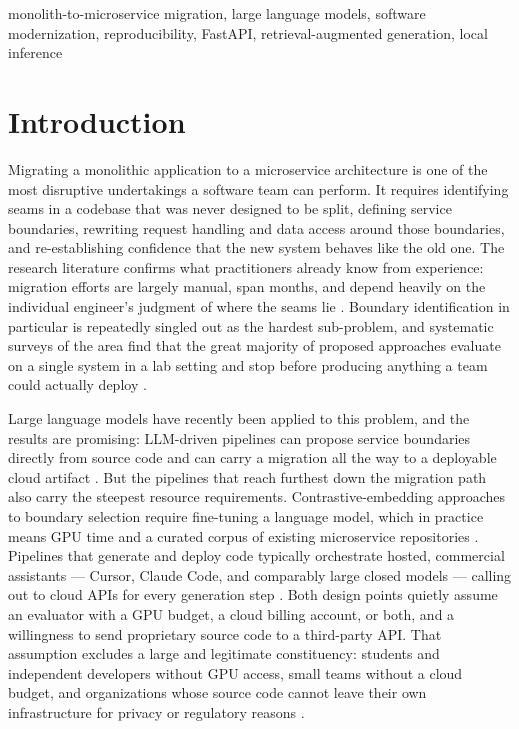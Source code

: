 \documentclass[conference]{IEEEtran}
\begin{document}
\begin{IEEEkeywords}
monolith-to-microservice migration, large language models, software modernization, reproducibility, FastAPI, retrieval-augmented generation, local inference
\end{IEEEkeywords}

\section{Introduction}

Migrating a monolithic application to a microservice architecture is one of the most disruptive undertakings a software team can perform. It requires identifying seams in a codebase that was never designed to be split, defining service boundaries, rewriting request handling and data access around those boundaries, and re-establishing confidence that the new system behaves like the old one. The research literature confirms what practitioners already know from experience: migration efforts are largely manual, span months, and depend heavily on the individual engineer's judgment of where the seams lie \cite{hassan2024,saucedo2025}. Boundary identification in particular is repeatedly singled out as the hardest sub-problem, and systematic surveys of the area find that the great majority of proposed approaches evaluate on a single system in a lab setting and stop before producing anything a team could actually deploy \cite{hassan2024,saucedo2025,abgaz2023}.

Large language models have recently been applied to this problem, and the results are promising: LLM-driven pipelines can propose service boundaries directly from source code \cite{sellami2025} and can carry a migration all the way to a deployable cloud artifact \cite{chen2026}. But the pipelines that reach furthest down the migration path also carry the steepest resource requirements. Contrastive-embedding approaches to boundary selection require fine-tuning a language model, which in practice means GPU time and a curated corpus of existing microservice repositories \cite{sellami2025}. Pipelines that generate and deploy code typically orchestrate hosted, commercial assistants --- Cursor, Claude Code, and comparably large closed models --- calling out to cloud APIs for every generation step \cite{chen2026}. Both design points quietly assume an evaluator with a GPU budget, a cloud billing account, or both, and a willingness to send proprietary source code to a third-party API. That assumption excludes a large and legitimate constituency: students and independent developers without GPU access, small teams without a cloud budget, and organizations whose source code cannot leave their own infrastructure for privacy or regulatory reasons \cite{huang2024}.
\end{document}
